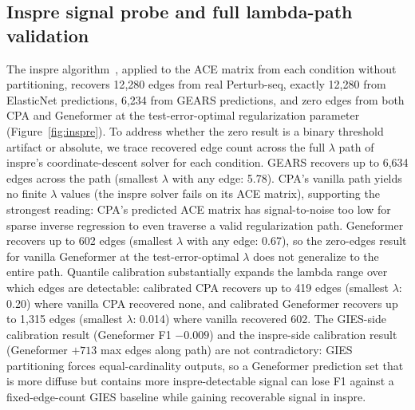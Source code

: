\documentclass{article}
\theoremstyle{plain}
\theoremstyle{definition}
\theoremstyle{remark}
\begin{document}
\subsection{Inspre signal probe and full lambda-path validation}
\label{app:inspre-path}
The inspre algorithm~\citep{brown2025inspre}, applied to the ACE matrix from each condition without partitioning, recovers 12{,}280 edges from real Perturb-seq, exactly 12{,}280 from ElasticNet predictions, 6{,}234 from GEARS predictions, and zero edges from both CPA and Geneformer at the test-error-optimal regularization parameter (Figure~\ref{fig:inspre}). To address whether the zero result is a binary threshold artifact or absolute, we trace recovered edge count across the full $\lambda$ path of inspre's coordinate-descent solver for each condition. GEARS recovers up to 6{,}634 edges across the path (smallest $\lambda$ with any edge: 5.78). CPA's vanilla path yields no finite $\lambda$ values (the inspre solver fails on its ACE matrix), supporting the strongest reading: CPA's predicted ACE matrix has signal-to-noise too low for sparse inverse regression to even traverse a valid regularization path. Geneformer recovers up to 602 edges (smallest $\lambda$ with any edge: 0.67), so the zero-edges result for vanilla Geneformer at the test-error-optimal $\lambda$ does not generalize to the entire path. Quantile calibration substantially expands the lambda range over which edges are detectable: calibrated CPA recovers up to 419 edges (smallest $\lambda$: 0.20) where vanilla CPA recovered none, and calibrated Geneformer recovers up to 1{,}315 edges (smallest $\lambda$: 0.014) where vanilla recovered 602. The GIES-side calibration result (Geneformer F1 $-0.009$) and the inspre-side calibration result (Geneformer $+713$ max edges along path) are not contradictory: GIES partitioning forces equal-cardinality outputs, so a Geneformer prediction set that is more diffuse but contains more inspre-detectable signal can lose F1 against a fixed-edge-count GIES baseline while gaining recoverable signal in inspre.
\end{document}
